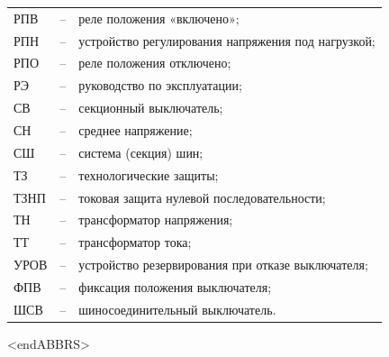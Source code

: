 \begin{longtable}{>{\raggedright\arraybackslash}m{2cm}>{\raggedright\arraybackslash}m{0.5cm}>{\raggedright\arraybackslash}m{20cm}}
РПВ & -- & реле положения «включено»; \\
РПН & -- & устройство регулирования напряжения под нагрузкой; \\
РПО & -- & реле положения отключено; \\
РЭ & -- & руководство по эксплуатации; \\
СВ & -- & секционный выключатель; \\
СН & -- & среднее напряжение; \\
СШ & -- & система (секция) шин; \\
ТЗ & -- & технологические защиты; \\
ТЗНП & -- & токовая защита нулевой последовательности; \\
ТН & -- & трансформатор напряжения; \\
ТТ & -- & трансформатор тока; \\
УРОВ & -- & устройство резервирования при отказе выключателя; \\
ФПВ & -- & фиксация положения выключателя; \\
ШСВ & -- & шиносоединительный выключатель. \\
\end{longtable}
{\color{white}\fontsize{0.1pt}{0.1pt}\selectfont<endABBRS>}
